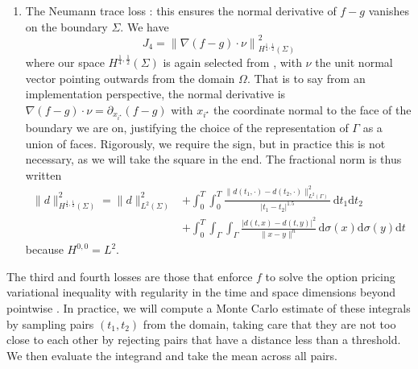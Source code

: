 \begin{enumerate}
    The time exponent $2.5$ is equal to $2p+1$ where $p$ is the decimal part of the time fractional exponent, and the space exponent is equal to $2\theta + n - 1$ where $\theta$ is the decimal part of the space fractional exponent, and $n$ the dimension. Note that here $\mathrm d \sigma(x)$ and $\mathrm d \sigma(y)$ indicate the surface measures on $\Gamma$, but in practice we can treat these as $\mathrm dx$ and $\mathrm dy$.

    \item The Neumann trace loss \cite{zang2020weak}: this ensures the normal derivative of $f-g$ vanishes on the boundary $\Sigma$. We have
    \begin{equation}
        J_4 =\left\|\nabla (f-g) \cdot \nu \right\|^2_{H^{\frac 14, \frac 12}(\Sigma)}
    \end{equation}
    where our space $H^{\frac 14, \frac 12} (\Sigma)$ is again selected from \cite{zhao2025neural}, with $\nu$ the unit normal vector pointing outwards from the domain $\Omega$. That is to say from an implementation perspective, the normal derivative is $\nabla(f-g)\cdot \nu = \partial_{x_{i^\star}}(f-g)$ with $x_{i^\star}$ the coordinate normal to the face of the boundary we are on, justifying the choice of the representation of $\Gamma$ as a union of faces. Rigorously, we require the sign, but in practice this is not necessary, as we will take the square in the end. The fractional norm is thus written
    \begin{equation}
        \begin{aligned}
            \|d\|^2_{H^{\frac 14, \frac 12}(\Sigma)} = \|d\|^2_{L^2(\Sigma)} &+ \int_0^T\int_0^T \frac{\|d(t_1, \cdot) - d(t_2, \cdot)\|^2_{L^2(\Gamma)}}{|t_1-t_2|^{1.5}}\,\mathrm dt_1\mathrm dt_2 \\ &+ \int_{0}^T\int_\Gamma\int_\Gamma \frac{|d(t, x) - d(t, y)|^2}{\|x-y\|^n}\,\mathrm d\sigma(x)\mathrm d\sigma (y)\mathrm dt
        \end{aligned}
    \end{equation}
    because $H^{0, 0} = L^2$.
\end{enumerate}

The third and fourth losses are those that enforce $f$ to solve the option pricing variational inequality with regularity in the time and space dimensions beyond pointwise \cite{lions2012non}. In practice, we will compute a Monte Carlo estimate of these integrals by sampling pairs $(t_1, t_2)$ from the domain, taking care that they are not too close to each other by rejecting pairs that have a distance less than a threshold. We then evaluate the integrand and take the mean across all pairs.

